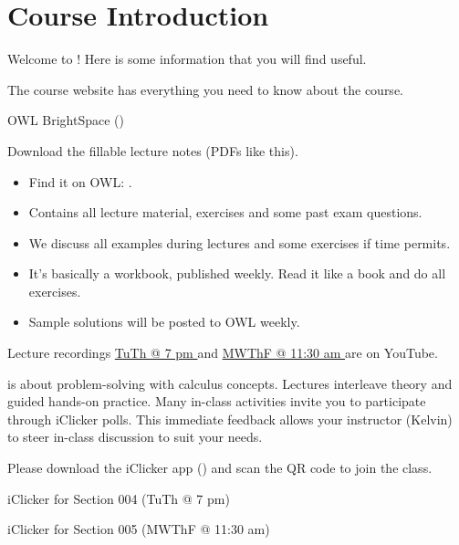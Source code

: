 \documentclass[../main.tex]{subfiles}
\begin{document}
 \section{Course Introduction}

Welcome to \thiscourse{}! Here is some information that you will find useful.

The course website has everything you need to know about the course.
\begin{center}

  OWL BrightSpace ()
\end{center}

\faStar{} Download the fillable lecture notes (PDFs like this).
\begin{itemize}
  \item Find it on OWL: .
  \item Contains all lecture material, exercises and some past exam questions.
  \item We discuss all examples during lectures and some exercises if time permits.
  \item It's basically a workbook, published weekly. Read it like a book and do all exercises.
  \item Sample solutions will be posted to OWL weekly.
\end{itemize}

\vfill{}

\faYoutube{} Lecture recordings \href{https://www.youtube.com/playlist?list=PLyo_vF0i2ojPuFS4MBXMSBpmbJj-hD0Eq}{\color{link}\footnotesize{}TuTh @ 7 pm \faExternalLink*{}} and
\href{https://www.youtube.com/playlist?list=PLyo_vF0i2ojNtHPMiXGUqk_P47ik-5-AU}{\color{link}\footnotesize{}MWThF @ 11:30 am \faExternalLink*{}} are on YouTube.

\thiscourse{} is about problem-solving with calculus concepts. Lectures interleave theory and guided hands-on practice. Many in-class activities invite you to participate through iClicker polls. This immediate feedback allows your instructor (Kelvin) to steer in-class discussion to suit your needs.

Please download the iClicker app () and scan the QR code to join the class.

\begin{minipage}{0.45\textwidth} \centering


  iClicker for Section 004 (TuTh @ 7 pm)
\end{minipage}%
\hfill
\begin{minipage}{0.54\textwidth} \centering


  iClicker for Section 005 (MWThF @ 11:30 am)
\end{minipage}
\end{document}
